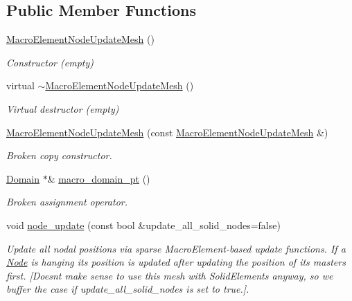 \subsection*{Public Member Functions}
\begin{DoxyCompactItemize}
\item 
\hyperlink{classoomph_1_1MacroElementNodeUpdateMesh_a6ef7edc84ad3427fed02c958a8cf76e1}{Macro\+Element\+Node\+Update\+Mesh} ()
\begin{DoxyCompactList}\small\item\em Constructor (empty) \end{DoxyCompactList}\item 
virtual \hyperlink{classoomph_1_1MacroElementNodeUpdateMesh_ab835a8aeb9dae5cf468f02a149fa04c5}{$\sim$\+Macro\+Element\+Node\+Update\+Mesh} ()
\begin{DoxyCompactList}\small\item\em Virtual destructor (empty) \end{DoxyCompactList}\item 
\hyperlink{classoomph_1_1MacroElementNodeUpdateMesh_a994ce2c395d1332f0ce523abde1d52d4}{Macro\+Element\+Node\+Update\+Mesh} (const \hyperlink{classoomph_1_1MacroElementNodeUpdateMesh}{Macro\+Element\+Node\+Update\+Mesh} \&)
\begin{DoxyCompactList}\small\item\em Broken copy constructor. \end{DoxyCompactList}\item 
\hyperlink{classoomph_1_1Domain}{Domain} $\ast$\& \hyperlink{classoomph_1_1MacroElementNodeUpdateMesh_af3b019d6a195493a7feb7f03832bb6fd}{macro\+\_\+domain\+\_\+pt} ()
\begin{DoxyCompactList}\small\item\em Broken assignment operator. \end{DoxyCompactList}\item 
void \hyperlink{classoomph_1_1MacroElementNodeUpdateMesh_ab5271c4514bcd236271307361423ac9d}{node\+\_\+update} (const bool \&update\+\_\+all\+\_\+solid\+\_\+nodes=false)
\begin{DoxyCompactList}\small\item\em Update all nodal positions via sparse Macro\+Element-\/based update functions. If a \hyperlink{classoomph_1_1Node}{Node} is hanging its position is updated after updating the position of its masters first. \mbox{[}Doesn\textquotesingle{}t make sense to use this mesh with Solid\+Elements anyway, so we buffer the case if update\+\_\+all\+\_\+solid\+\_\+nodes is set to true.\mbox{]}. \end{DoxyCompactList}\item 

\end{DoxyCompactItemize}
